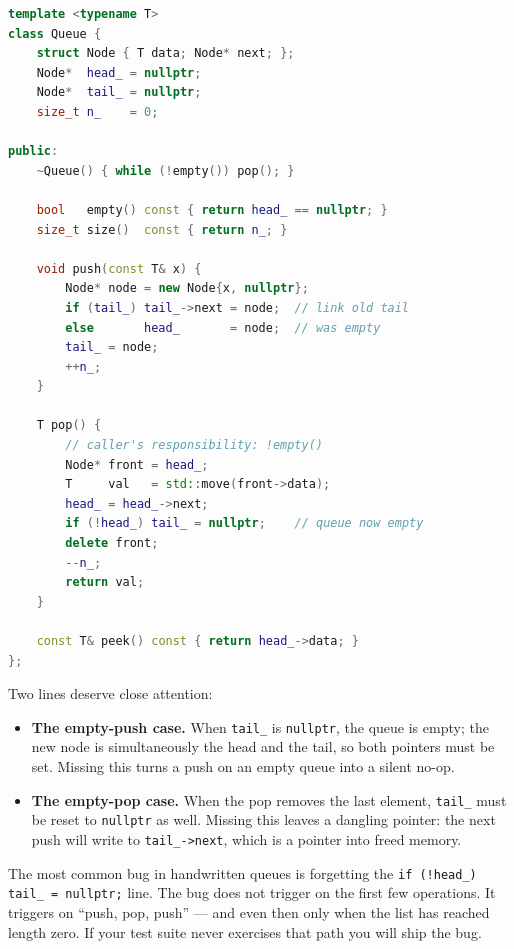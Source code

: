 \documentclass[11pt]{article}
\begin{document}
\begin{examplebox}
\begin{lstlisting}[language=C++,basicstyle=\ttfamily\small,frame=single]
template <typename T>
class Queue {
    struct Node { T data; Node* next; };
    Node*  head_ = nullptr;
    Node*  tail_ = nullptr;
    size_t n_    = 0;

public:
    ~Queue() { while (!empty()) pop(); }

    bool   empty() const { return head_ == nullptr; }
    size_t size()  const { return n_; }

    void push(const T& x) {
        Node* node = new Node{x, nullptr};
        if (tail_) tail_->next = node;  // link old tail
        else       head_       = node;  // was empty
        tail_ = node;
        ++n_;
    }

    T pop() {
        // caller's responsibility: !empty()
        Node* front = head_;
        T     val   = std::move(front->data);
        head_ = head_->next;
        if (!head_) tail_ = nullptr;    // queue now empty
        delete front;
        --n_;
        return val;
    }

    const T& peek() const { return head_->data; }
};
\end{lstlisting}
\end{examplebox}

Two lines deserve close attention:

\begin{itemize}[leftmargin=*]
    \item \textbf{The empty-push case.} When \texttt{tail\_} is
          \texttt{nullptr}, the queue is empty; the new node is
          simultaneously the head and the tail, so both pointers
          must be set. Missing this turns a push on an empty
          queue into a silent no-op.
    \item \textbf{The empty-pop case.} When the pop removes the
          last element, \texttt{tail\_} must be reset to
          \texttt{nullptr} as well. Missing this leaves a
          dangling pointer: the next push will write to
          \texttt{tail\_->next}, which is a pointer into freed
          memory.
\end{itemize}

\begin{warnbox}
The most common bug in handwritten queues is forgetting the
\texttt{if (!head\_) tail\_ = nullptr;} line. The bug does not
trigger on the first few operations. It triggers on ``push, pop,
push'' --- and even then only when the list has reached length
zero. If your test suite never exercises that path you will ship
the bug.
\end{warnbox}
\end{document}
